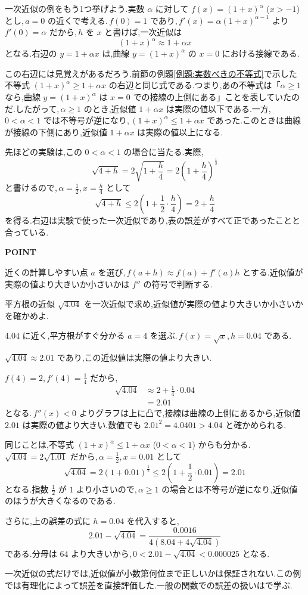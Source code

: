一次近似の例をもう1つ挙げよう.実数 $\alpha$ に対して $f(x)=(1+x)^\alpha$ ($x>-1$) とし,\,$a=0$ の近くで考える.\,$f(0)=1$ であり,\,$f'(x)=\alpha(1+x)^{\alpha-1}$ より $f'(0)=\alpha$ だから,\,$h$ を $x$ と書けば,一次近似は
\[
 (1+x)^\alpha\approx1+\alpha x
\]
となる.右辺の $y=1+\alpha x$ は,曲線 $y=(1+x)^\alpha$ の $x=0$ における接線である.

この右辺には見覚えがあるだろう.前節の例題\ref{例題:実数べきの不等式}で示した不等式 $(1+x)^\alpha\ge1+\alpha x$ の右辺と同じ式である.つまり,あの不等式は「$\alpha\ge1$ なら,曲線 $y=(1+x)^\alpha$ は $x=0$ での接線の上側にある」ことを表していたのだ.したがって,\,$\alpha\ge1$ のとき,近似値 $1+\alpha x$ は実際の値以下である.一方,\,$0<\alpha<1$ では不等号が逆になり,\,$(1+x)^\alpha\le1+\alpha x$ であった.このときは曲線が接線の下側にあり,近似値 $1+\alpha x$ は実際の値以上になる.

先ほどの実験は,この $0<\alpha<1$ の場合に当たる.実際,
\[
 \sqrt{4+h}=2\sqrt{1+\frac h4}=2\left(1+\frac h4\right)^{\frac12}
\]
と書けるので,\,$\alpha=\frac12$,\,$x=\frac h4$ として
\[
 \sqrt{4+h}\le2\left(1+\frac12\cdot\frac h4\right)=2+\frac h4
\]
を得る.右辺は実験で使った一次近似であり,表の誤差がすべて正であったことと合っている.

\begin{bookpoint}
\textbf{POINT}\par
近くの計算しやすい点 $a$ を選び,\,$f(a+h)\approx f(a)+f'(a)h$ とする.近似値が実際の値より大きいか小さいかは $f''$ の符号で判断する.
\end{bookpoint}

\begin{example}{平方根の近似}
$\sqrt{4.04}$ を一次近似で求め,近似値が実際の値より大きいか小さいかを確かめよ.
\end{example}
$4.04$ に近く,平方根がすぐ分かる $a=4$ を選ぶ.\,$f(x)=\sqrt x$,\,$h=0.04$ である.

$\sqrt{4.04}\approx2.01$ であり,この近似値は実際の値より大きい.

$f(4)=2$,\,$f'(4)=\frac14$ だから,
\begin{align*}
 \sqrt{4.04}&\approx2+\frac14\cdot0.04\\
 &=2.01
\end{align*}
となる.\,$f''(x)<0$ よりグラフは上に凸で,接線は曲線の上側にあるから,近似値 $2.01$ は実際の値より大きい.数値でも $2.01^2=4.0401>4.04$ と確かめられる.

同じことは,不等式 $(1+x)^\alpha\le1+\alpha x$ ($0<\alpha<1$) からも分かる.\,$\sqrt{4.04}=2\sqrt{1.01}$ だから,\,$\alpha=\frac12$,\,$x=0.01$ として
\[
 \sqrt{4.04}=2(1+0.01)^{\frac12}\le2\left(1+\frac12\cdot0.01\right)=2.01
\]
となる.指数 $\frac12$ が $1$ より小さいので,\,$\alpha\ge1$ の場合とは不等号が逆になり,近似値のほうが大きくなるのである.

さらに,上の誤差の式に $h=0.04$ を代入すると,
\[
 2.01-\sqrt{4.04}=\frac{0.0016}{4\left(8.04+4\sqrt{4.04}\right)}
\]
である.分母は $64$ より大きいから,\,$0<2.01-\sqrt{4.04}<0.000025$ となる.

一次近似の式だけでは,近似値が小数第何位まで正しいかは保証されない.この例では有理化によって誤差を直接評価した.一般の関数での誤差の扱いはで学ぶ.
